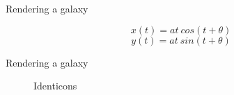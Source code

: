 \documentclass{beamer}
\begin{document}
\begin{frame}{Rendering a galaxy}
\begin{minipage}{.60\textwidth}
\noindent{}
\end{minipage}
\begin{minipage}{.35\textwidth}
$$x(t) = at \: cos(t + \theta)$$
         $$y(t) = at \: sin(t + \theta)$$
\end{minipage}
\end{frame}
\begin{frame}{Rendering a galaxy}
\begin{figure}[H]
\noindent{}
\caption{Identicons}
\end{figure}
\end{frame}
\end{document}
